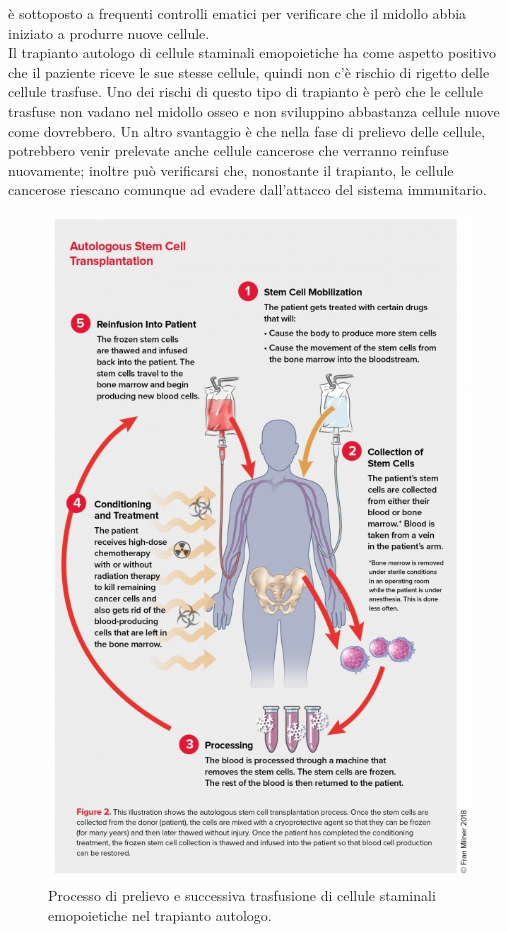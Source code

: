 è sottoposto a frequenti controlli ematici per verificare che il midollo abbia iniziato a produrre nuove cellule\cite{LLSBLOOD}.\\
Il trapianto autologo di cellule staminali emopoietiche ha come aspetto positivo che il paziente riceve le sue stesse cellule, quindi non c’è rischio di rigetto delle cellule trasfuse. 
Uno dei rischi di questo tipo di trapianto è però che le cellule trasfuse non vadano nel midollo osseo e non 
sviluppino abbastanza cellule nuove come dovrebbero. Un altro svantaggio è che nella fase di prelievo delle cellule, 
potrebbero venir prelevate anche cellule cancerose che verranno reinfuse nuovamente; inoltre  può verificarsi che, 
nonostante il trapianto, le cellule cancerose riescano comunque ad evadere dall’attacco del sistema immunitario\cite{STEMCELLS}.\\

\begin{figure}[H]
    \begin{center}
    \includegraphics[width=0.8\columnwidth]{img/AUTOLOGO.jpeg}
    \end{center}
    \caption[Processo di prelievo e successiva trasfusione di cellule staminali emopoietiche nel trapianto autologo.]{Processo di prelievo e successiva trasfusione di cellule staminali emopoietiche nel trapianto autologo.
    \cite{img36}}

\end{figure}

